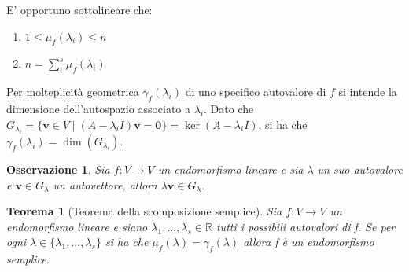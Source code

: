 \documentclass{article}
\newtheorem{theorem}{Teorema}
\newtheorem{osservazione}{Osservazione}
\begin{document}
    E' opportuno sottolineare che: 
    \begin{enumerate}[label=(\arabic*)]
        \item $1 \leq \mu_f(\lambda_i) \leq n$ 
        \item $n = \displaystyle \sum_{i}^{s} \mu_f(\lambda_i)$
    \end{enumerate}

    \vspace{10pt}
    Per molteplicità geometrica $\gamma_f(\lambda_i)$ di uno specifico autovalore di $f$ si intende la dimensione dell'autospazio associato a $\lambda_i$. Dato che $G_{\lambda_i} = \{ \mathbf{v} \in V \; | \; (A - \lambda_i I) \mathbf{v} = \mathbf{0}\} = \ker(A - \lambda_i I)$, si ha che $\gamma_{f}(\lambda_i) = \dim(G_{\lambda_{i}})$.

    \vspace{10pt}
    \begin{osservazione}
        Sia $f: V \rightarrow V$ un endomorfismo lineare e sia $\lambda$ un suo autovalore e $\mathbf{v} \in G_{\lambda}$ un autovettore, allora $\lambda \mathbf{v} \in G_{\lambda}$.
    \end{osservazione}

    \newpage
    \vspace{10pt}
    \begin{theorem}[Teorema della scomposizione semplice]
        Sia $f : V \rightarrow V$ un endomorfismo lineare e siano $\lambda_1, ..., \lambda_s \in \mathbb{R}$ tutti i possibili autovalori di f. Se per ogni $\lambda \in \{\lambda_1, ..., \lambda_s\}$ si ha che $\mu_f(\lambda) = \gamma_f(\lambda)$ allora f è un endomorfismo semplice.
    \end{theorem}
\end{document}

